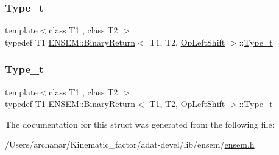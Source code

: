 \mbox{\label{structENSEM_1_1BinaryReturn_3_01T1_00_01T2_00_01OpLeftShift_01_4_a5b3c8cfdda3306ec2d9343185aba7e71}} 
\subsubsection{\texorpdfstring{Type\_t}{Type\_t}\hspace{0.1cm}{\footnotesize\ttfamily [2/3]}}
{\footnotesize\ttfamily template$<$class T1 , class T2 $>$ \\
typedef T1 \mbox{\hyperlink{structENSEM_1_1BinaryReturn}{E\+N\+S\+E\+M\+::\+Binary\+Return}}$<$ T1, T2, \mbox{\hyperlink{structENSEM_1_1OpLeftShift}{Op\+Left\+Shift}} $>$\+::\mbox{\hyperlink{structENSEM_1_1BinaryReturn_3_01T1_00_01T2_00_01OpLeftShift_01_4_a5b3c8cfdda3306ec2d9343185aba7e71}{Type\+\_\+t}}}

\mbox{\label{structENSEM_1_1BinaryReturn_3_01T1_00_01T2_00_01OpLeftShift_01_4_a5b3c8cfdda3306ec2d9343185aba7e71}} 
\subsubsection{\texorpdfstring{Type\_t}{Type\_t}\hspace{0.1cm}{\footnotesize\ttfamily [3/3]}}
{\footnotesize\ttfamily template$<$class T1 , class T2 $>$ \\
typedef T1 \mbox{\hyperlink{structENSEM_1_1BinaryReturn}{E\+N\+S\+E\+M\+::\+Binary\+Return}}$<$ T1, T2, \mbox{\hyperlink{structENSEM_1_1OpLeftShift}{Op\+Left\+Shift}} $>$\+::\mbox{\hyperlink{structENSEM_1_1BinaryReturn_3_01T1_00_01T2_00_01OpLeftShift_01_4_a5b3c8cfdda3306ec2d9343185aba7e71}{Type\+\_\+t}}}



The documentation for this struct was generated from the following file\+:\begin{DoxyCompactItemize}
\item 
/\+Users/archanar/\+Kinematic\+\_\+factor/adat-\/devel/lib/ensem/\mbox{\hyperlink{adat-devel_2lib_2ensem_2ensem_8h}{ensem.\+h}}\end{DoxyCompactItemize}
